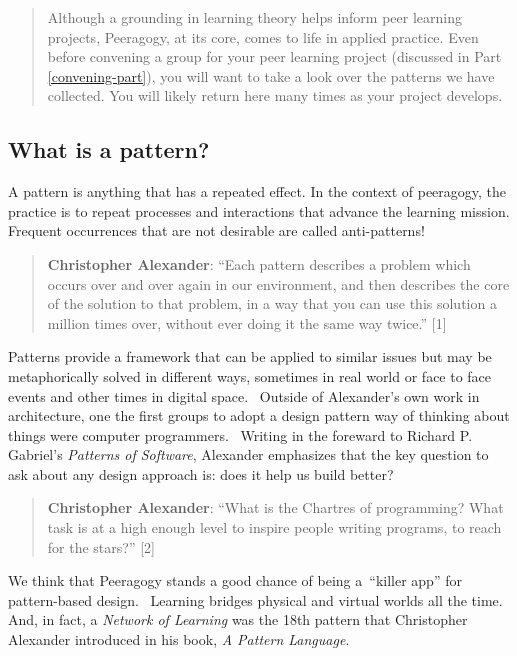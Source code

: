\begin{quote}
Although a grounding in learning theory helps inform peer learning
projects, Peeragogy, at its core, comes to life in applied practice.
Even before convening a group for your peer learning project
(discussed in Part \ref{convening-part}), you will want to take a look
over the patterns we have collected.  You will likely return here many
times as your project develops.
\end{quote}

\subsection{What is a pattern?}

A pattern is anything that has a repeated effect. In the context of
peeragogy, the practice is to repeat processes and interactions that
advance the learning mission. Frequent occurrences that are not
desirable are called anti-patterns!

\begin{quote}
\textbf{Christopher Alexander}: ``Each pattern describes a problem which
occurs over and over again in our environment, and then describes the
core of the solution to that problem, in a way that you can use this
solution a million times over, without ever doing it the same way
twice.'' {[}1{]}
\end{quote}

Patterns provide a framework that can be applied to similar issues but
may be metaphorically solved in different ways, sometimes in real world
or face to face events and other times in digital space.~ Outside of
Alexander's own work in architecture, one the first groups to adopt a
design pattern way of thinking about things were computer programmers.~
Writing in the foreward to Richard P. Gabriel's \emph{Patterns of
Software}, Alexander emphasizes that the key question to ask about any
design approach is: does it help us build better?

\begin{quote}
\textbf{Christopher Alexander}: ``What is the Chartres of programming?
What task is at a high enough level to inspire people writing programs,
to reach for the stars?'' {[}2{]}
\end{quote}

We think that Peeragogy stands a good chance of being a~``killer app''
for pattern-based design.~ Learning bridges physical and virtual worlds
all the time.~ And, in fact, a \emph{Network of Learning} was the 18th
pattern that Christopher Alexander introduced in his book, \emph{A
Pattern Language}.

